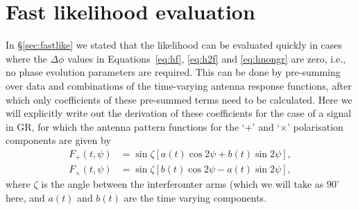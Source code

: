 \section{Fast likelihood evaluation}\label{app:fle}

In \S\ref{sec:fastlike} we stated that the likelihood can be evaluated quickly in cases where the $\Delta\phi$ values in Equations~\ref{eq:hf}, \ref{eq:h2f}
and \ref{eq:hnongr} are zero, i.e., no phase evolution parameters are required. This can be done by pre-summing over data and combinations of the time-varying
antenna response functions, after which only coefficients of these pre-summed terms need to be calculated. Here we will explicitly write out the derivation
of these coefficients for the case of a signal in GR, for which the antenna pattern functions for the `+' and `$\times$' polarisation components are given by
\citep{1998PhRvD..58f3001J}
\begin{align}\label{eq:antenna2}
F_+(t,\psi) &= \sin{\zeta}\left[a(t)\cos{2\psi} + b(t)\sin{2\psi}\right], \nonumber \\
F_{\times}(t,\psi) &= \sin{\zeta}\left[b(t)\cos{2\psi} - a(t)\sin{2\psi}\right],
\end{align}
where $\zeta$ is the angle between the interferomter arms (which we will take as $90^{\circ}$ here, and $a(t)$ and $b(t)$ are the time varying components.